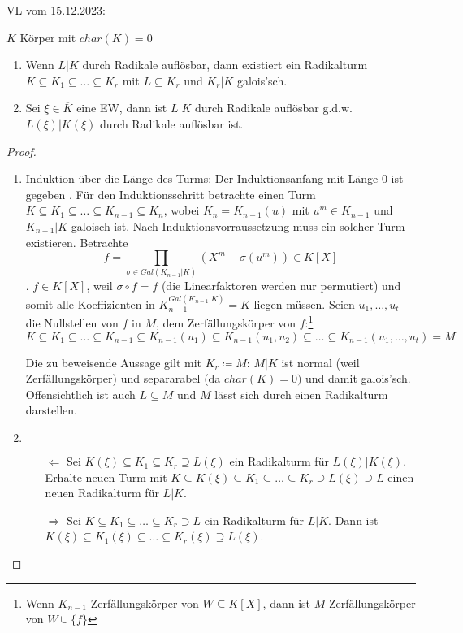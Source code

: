 \documentclass[../main.tex]{subfiles}
\begin{document}
\begin{flushright}
VL vom 15.12.2023:
\end{flushright}
\begin{lemma}\label{theo:3.24}
    $K$ Körper mit $char(K)=0$
    \begin{enumerate}[label=\alph*)]
        \item Wenn $L|K$ durch Radikale auflösbar, dann existiert ein Radikalturm $K\subseteq K_1\subseteq\dots\subseteq K_r$ mit $L\subseteq K_r$ und $K_r|K$ galois'sch.
        \item Sei $\xi \in \overline{K}$  eine EW, dann ist $L|K$ durch Radikale auflösbar g.d.w. $L(\xi)|K(\xi)$ durch Radikale auflösbar ist.
    \end{enumerate}
\end{lemma}
\begin{proof}
    \begin{enumerate}[label=\alph*)]
        \item Induktion über die Länge des Turms:
        Der Induktionsanfang mit Länge $0$ ist gegeben \checkmark.
        Für den Induktionsschritt betrachte einen Turm $K\subseteq K_1\subseteq\dots\subseteq K_{n-1}\subseteq K_n$, wobei $K_n = K_{n-1}(u)$ mit $u^m \in K_{n-1}$ und $K_{n-1}|K$ galoisch ist.
        Nach Induktionsvorraussetzung muss ein solcher Turm existieren.
        Betrachte $$f = \prod_{\sigma\in Gal(K_{n-1}|K)} \left(X^m-\sigma(u^m)\right)\in K[X]$$.
        $f\in K[X]$, weil $\sigma\circ f=f$ (die Linearfaktoren werden nur permutiert) und somit alle Koeffizienten in $K_{n-1}^{Gal(K_{n-1}|K)}=K$ liegen müssen.
        Seien $u_1,\dots,u_t$ die Nullstellen von $f$ in $M$, dem Zerfällungskörper von $f$:\footnote{Wenn $K_{n-1}$ Zerfällungskörper von $W\subseteq K[X]$, dann ist $M$ Zerfällungskörper von $W\cup \{f\}$}
        $$K\subseteq K_1\subseteq\dots\subseteq K_{n-1}\subseteq K_{n-1}(u_1)\subseteq K_{n-1}(u_1,u_2)\subseteq\dots\subseteq K_{n-1}(u_1,\dots,u_t)=M$$

        Die zu beweisende Aussage gilt mit $K_r\coloneqq M$:
        $M|K$ ist normal (weil Zerfällungskörper) und separarabel (da $char(K)=0)$ und damit galois'sch.
        Offensichtlich ist auch $L\subseteq M$ und $M$ lässt sich durch einen Radikalturm darstellen.
        

        \item $ $
        \begin{itemize}
            \item[$\Leftarrow$] Sei $K(\xi) \subseteq K_1\subseteq K_r\supseteq L(\xi)$ ein Radikalturm für $L(\xi)|K(\xi)$.
            Erhalte neuen Turm mit $K\subseteq K(\xi)\subseteq K_1\subseteq\dots\subseteq K_r \supseteq L(\xi)\supseteq L$ einen neuen Radikalturm für $L|K$.
            \item[$\Rightarrow$]
            Sei $K\subseteq K_1\subseteq \dots\subseteq K_r\supset L$ ein Radikalturm für $L|K$.
            Dann ist $K(\xi)\subseteq K_1(\xi)\subseteq\dots\subseteq K_r(\xi)\supseteq L(\xi)$.
        \end{itemize}
    \end{enumerate}
\end{proof}
\end{document}
